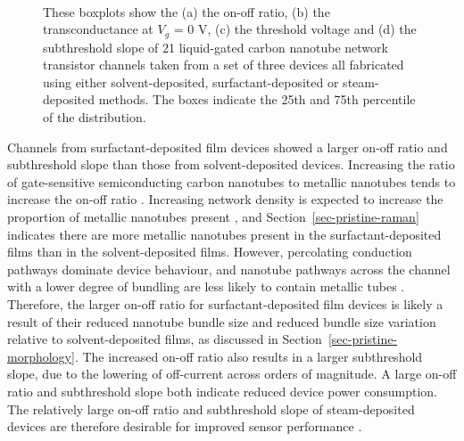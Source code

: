 \documentclass[
  a4paper,
]{scrbook}
\begin{document}
\begin{figure}
\begin{minipage}[t]{0.45\linewidth}
{{}

}

\end{minipage}%
%
\begin{minipage}[t]{0.01\linewidth}

{\centering 

~

}

\end{minipage}%

\caption[Boxplots showing the statistical distribution of the on-off
ratio, transconductance, threshold voltage and subthreshold slope of
liquid-gated encapsulated carbon nanotube network transistor channels
with thin-films deposited using various
methods.]{\label{fig-sweep-parameters}These boxplots show the (a) the
on-off ratio, (b) the transconductance at \(V_g\) = 0 V, (c) the
threshold voltage and (d) the subthreshold slope of 21 liquid-gated
carbon nanotube network transistor channels taken from a set of three
devices all fabricated using either solvent-deposited,
surfactant-deposited or steam-deposited methods. The boxes indicate the
25th and 75th percentile of the distribution.}

\end{figure}

Channels from surfactant-deposited film devices showed a larger on-off
ratio and subthreshold slope than those from solvent-deposited devices.
Increasing the ratio of gate-sensitive semiconducting carbon nanotubes
to metallic nanotubes tends to increase the on-off ratio
\autocite{LeMieux2008,Rouhi2011,Zaumseil2015,Murugathas2018}. Increasing
network density is expected to increase the proportion of metallic
nanotubes present \autocite{Rouhi2011}, and
Section~\ref{sec-pristine-raman} indicates there are more metallic
nanotubes present in the surfactant-deposited films than in the
solvent-deposited films. However, percolating conduction pathways
dominate device behaviour, and nanotube pathways across the channel with
a lower degree of bundling are less likely to contain metallic tubes
\autocite{Murugathas2018}. Therefore, the larger on-off ratio for
surfactant-deposited film devices is likely a result of their reduced
nanotube bundle size and reduced bundle size variation relative to
solvent-deposited films, as discussed in
Section~\ref{sec-pristine-morphology}. The increased on-off ratio also
results in a larger subthreshold slope, due to the lowering of
off-current across orders of magnitude. A large on-off ratio and
subthreshold slope both indicate reduced device power consumption. The
relatively large on-off ratio and subthreshold slope of steam-deposited
devices are therefore desirable for improved sensor performance
\autocite{Kauffman2008,Heller2009,Gao2010}.
\end{document}
